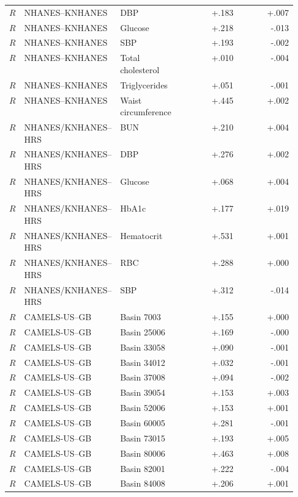 {\begin{longtable}{P{0.045\linewidth}P{0.27\linewidth}P{0.23\linewidth}rr}
$R$ & NHANES--KNHANES & DBP & +.183 & +.007 \\
$R$ & NHANES--KNHANES & Glucose & +.218 & -.013 \\
$R$ & NHANES--KNHANES & SBP & +.193 & -.002 \\
$R$ & NHANES--KNHANES & Total cholesterol & +.010 & -.004 \\
$R$ & NHANES--KNHANES & Triglycerides & +.051 & -.001 \\
$R$ & NHANES--KNHANES & Waist circumference & +.445 & +.002 \\
\addlinespace[1pt]
$R$ & NHANES/KNHANES--HRS & BUN & +.210 & +.004 \\
$R$ & NHANES/KNHANES--HRS & DBP & +.276 & +.002 \\
$R$ & NHANES/KNHANES--HRS & Glucose & +.068 & +.004 \\
$R$ & NHANES/KNHANES--HRS & HbA1c & +.177 & +.019 \\
$R$ & NHANES/KNHANES--HRS & Hematocrit & +.531 & +.001 \\
$R$ & NHANES/KNHANES--HRS & RBC & +.288 & +.000 \\
$R$ & NHANES/KNHANES--HRS & SBP & +.312 & -.014 \\
\addlinespace[1pt]
$R$ & CAMELS-US--GB & Basin 7003 & +.155 & +.000 \\
$R$ & CAMELS-US--GB & Basin 25006 & +.169 & -.000 \\
$R$ & CAMELS-US--GB & Basin 33058 & +.090 & -.001 \\
$R$ & CAMELS-US--GB & Basin 34012 & +.032 & -.001 \\
$R$ & CAMELS-US--GB & Basin 37008 & +.094 & -.002 \\
$R$ & CAMELS-US--GB & Basin 39054 & +.153 & +.003 \\
$R$ & CAMELS-US--GB & Basin 52006 & +.153 & +.001 \\
$R$ & CAMELS-US--GB & Basin 60005 & +.281 & -.001 \\
$R$ & CAMELS-US--GB & Basin 73015 & +.193 & +.005 \\
$R$ & CAMELS-US--GB & Basin 80006 & +.463 & +.008 \\
$R$ & CAMELS-US--GB & Basin 82001 & +.222 & -.004 \\
$R$ & CAMELS-US--GB & Basin 84008 & +.206 & +.001 \\
\end{longtable}
 }

